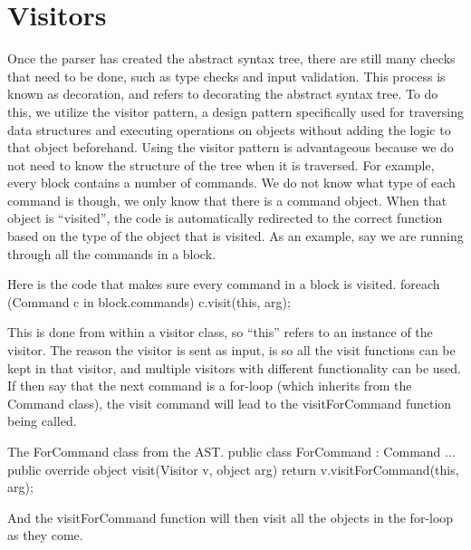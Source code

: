 \section{Visitors}
Once the parser has created the abstract syntax tree, there are still many checks that need to be done, such as type checks and input validation. 
This process is known as decoration, and refers to decorating the abstract syntax tree. \newline
To do this, we utilize the visitor pattern, a design pattern specifically used for traversing data structures and executing operations on objects without adding the logic to that object beforehand. \newline
Using the visitor pattern is advantageous because we do not need to know the structure of the tree when it is traversed.
For example, every block contains a number of commands. 
We do not know what type of each command is though, we only know that there is a command object. 
When that object is "`visited"', the code is automatically redirected to the correct function based on the type of the object that is visited. \newline\newline
As an example, say we are running through all the commands in a block.
\newline
\begin{source}{Here is the code that makes sure every command in a block is visited.}{}
foreach (Command c in block.commands)
  {
		c.visit(this, arg);
	}
\end{source}
\newline
This is done from within a visitor class, so "`this"' refers to an instance of the visitor. 
The reason the visitor is sent as input, is so all the visit functions can be kept in that visitor, and multiple visitors with different functionality can be used.
If then say that the next command is a for-loop (which inherits from the Command class), the visit command will lead to the visitForCommand function being called.
\newline
\begin{source}{The ForCommand class from the AST.}{}
public class ForCommand : Command
    {
        ...
        public override object visit(Visitor v, object arg)
        {
            return v.visitForCommand(this, arg);
        }
    }
\end{source}
\newline
And the visitForCommand function will then visit all the objects in the for-loop as they come.
\newline
